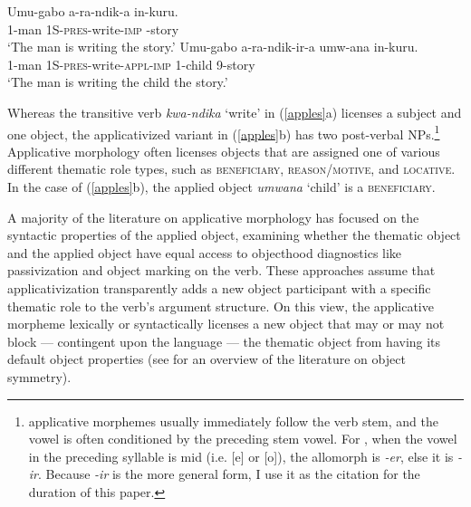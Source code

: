 \documentclass[output=paper]{langsci/langscibook}
\begin{document}
\begin{exe}
\ex\label{apples}
	\begin{xlist}
          \ex\gll Umu-gabo a-ra-ndik-a in-kuru.\\
          {\scshape 1}-man {\scshape 1S-pres}-write-{\scshape imp} {-}story\\
          \glt `The man is writing the story.'
          \ex\gll Umu-gabo a-ra-ndik-ir-a umw-ana in-kuru.\\
          {\scshape 1}-man {\scshape 1S-pres}-write-{\scshape appl-imp} {\scshape 1-}child {\scshape 9-}story\\
          \glt `The man is writing the child the story.'
	\end{xlist}
\end{exe} 
%
Whereas the transitive verb \emph{kwa-ndika} `write' in (\ref{apples}a) licenses a subject and one object, the applicativized variant in (\ref{apples}b) has two post-verbal NPs.\footnote{ applicative morphemes usually immediately follow  the verb stem, and the vowel is often conditioned by the preceding stem vowel. For , when the vowel in the preceding syllable is mid (i.e. [e] or [o]), the allomorph is \emph{-er}, else it is \emph{-ir}. Because \emph{-ir} is the more general form, I use it as the citation for the duration of this paper.}  Applicative morphology often licenses objects that are assigned one of various different thematic role types, such as {\scshape beneficiary, reason/motive,} and {\scshape locative}. In the case of (\ref{apples}b), the applied object  \emph{umwana} `child' is a {\scshape beneficiary}.

 A majority of the literature on applicative morphology has focused on the syntactic properties of the applied object, examining whether the thematic object and the applied object have equal access to objecthood diagnostics like passivization and object marking on the verb. These approaches assume that applicativization transparently adds a new object participant with a specific thematic role to the verb's argument structure.  On this view, the applicative morpheme lexically or syntactically licenses a new object that may or may not block --- contingent upon the language ---  the thematic object from having its default object properties (see  for an overview of the literature on object symmetry).
\end{document}

